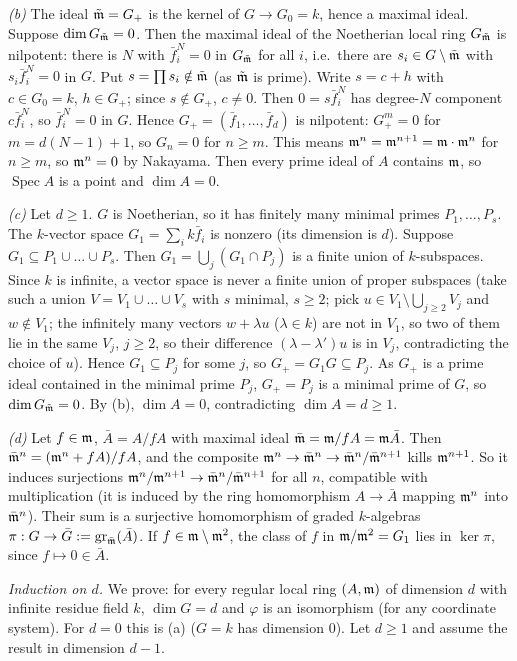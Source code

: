 \documentclass[11pt]{article}
\begin{document}
\emph{(b)} The ideal $\tilde{\mathfrak m}=G_+$ is the kernel of $G\to G_0=k$, hence a maximal ideal. Suppose $\dim G_{\tilde{\mathfrak m}}=0$. Then the maximal ideal of the Noetherian local ring $G_{\tilde{\mathfrak m}}$ is nilpotent: there is $N$ with $\bar f_i^N=0$ in $G_{\tilde{\mathfrak m}}$ for all $i$, i.e.\ there are $s_i\in G\setminus\tilde{\mathfrak m}$ with $s_i\bar f_i^N=0$ in $G$. Put $s=\prod s_i\notin\tilde{\mathfrak m}$ (as $\tilde{\mathfrak m}$ is prime). Write $s=c+h$ with $c\in G_0=k$, $h\in G_+$; since $s\notin G_+$, $c\ne0$. Then $0=s\bar f_i^N$ has degree-$N$ component $c\bar f_i^N$, so $\bar f_i^N=0$ in $G$. Hence $G_+=(\bar f_1,\dots,\bar f_d)$ is nilpotent: $G_+^{m}=0$ for $m=d(N-1)+1$, so $G_n=0$ for $n\ge m$. This means $\mathfrak m^n=\mathfrak m^{n+1}=\mathfrak m\cdot\mathfrak m^n$ for $n\ge m$, so $\mathfrak m^n=0$ by Nakayama. Then every prime ideal of $A$ contains $\mathfrak m$, so $\operatorname{Spec}A$ is a point and $\dim A=0$.

\emph{(c)} Let $d\ge1$. $G$ is Noetherian, so it has finitely many minimal primes $P_1,\dots,P_s$. The $k$-vector space $G_1=\sum_ik\bar f_i$ is nonzero (its dimension is $d$). Suppose $G_1\subseteq P_1\cup\dots\cup P_s$. Then $G_1=\bigcup_j(G_1\cap P_j)$ is a finite union of $k$-subspaces. Since $k$ is infinite, a vector space is never a finite union of proper subspaces (take such a union $V=V_1\cup\dots\cup V_s$ with $s$ minimal, $s\geq 2$; pick $u\in V_1\setminus\bigcup_{j\ge2}V_j$ and $w\notin V_1$; the infinitely many vectors $w+\lambda u$ ($\lambda\in k$) are not in $V_1$, so two of them lie in the same $V_j$, $j\ge2$, so their difference $(\lambda-\lambda')u$ is in $V_j$, contradicting the choice of $u$). Hence $G_1\subseteq P_j$ for some $j$, so $G_+=G_1G\subseteq P_j$. As $G_+$ is a prime ideal contained in the minimal prime $P_j$, $G_+=P_j$ is a minimal prime of $G$, so $\dim G_{\tilde{\mathfrak m}}=0$. By (b), $\dim A=0$, contradicting $\dim A=d\ge1$.

\emph{(d)} Let $f\in\mathfrak m$, $\bar A=A/fA$ with maximal ideal $\bar{\mathfrak m}=\mathfrak m/fA=\mathfrak m\bar A$. Then $\bar{\mathfrak m}^n=(\mathfrak m^n+fA)/fA$, and the composite $\mathfrak m^n\to\bar{\mathfrak m}^n\to\bar{\mathfrak m}^n/\bar{\mathfrak m}^{n+1}$ kills $\mathfrak m^{n+1}$. So it induces surjections $\mathfrak m^n/\mathfrak m^{n+1}\to\bar{\mathfrak m}^n/\bar{\mathfrak m}^{n+1}$ for all $n$, compatible with multiplication (it is induced by the ring homomorphism $A\to\bar A$ mapping $\mathfrak m^n$ into $\bar{\mathfrak m}^n$). Their sum is a surjective homomorphism of graded $k$-algebras $\pi:G\to\bar G:=\operatorname{gr}_{\bar{\mathfrak m}}(\bar A)$. If $f\in\mathfrak m\setminus\mathfrak m^2$, the class of $f$ in $\mathfrak m/\mathfrak m^2=G_1$ lies in $\ker\pi$, since $f\mapsto0\in\bar A$.

\emph{Induction on $d$.} We prove: for every regular local ring $(A,\mathfrak m)$ of dimension $d$ with infinite residue field $k$, $\dim G=d$ and $\varphi$ is an isomorphism (for any coordinate system). For $d=0$ this is (a) ($G=k$ has dimension $0$). Let $d\ge1$ and assume the result in dimension $d-1$.
\end{document}
